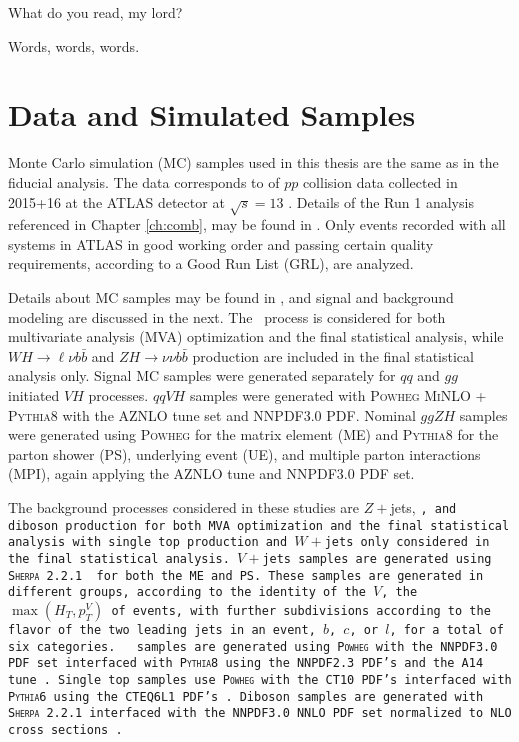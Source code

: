 \begin{savequote}[75mm]
What do you read, my lord?

Words, words, words.
\end{savequote}

\chapter{Data and Simulated Samples}
\label{ch:samples}
 Monte Carlo simulation (MC) samples used in this thesis are the same as in the fiducial analysis.  The data corresponds to \LUMI of $pp$ collision data collected in 2015+16 at the ATLAS detector at $\sqrt{s}=13$ \TeV.  Details of the Run 1 analysis referenced in Chapter \ref{ch:comb}, may be found in \cite{run1note}.  Only events recorded with all systems in ATLAS in good working order and passing certain quality requirements, according to a Good Run List (GRL), are analyzed.  

Details about MC samples may be found in \cite{modelingnote}, and signal and background modeling are discussed in the next.  The \ZH\, process is considered for both multivariate analysis (MVA) optimization and the final statistical analysis, while $WH\to\ell\nu b\bar{b}$ and $ZH\to\nu\nu b\bar{b}$ production are included in the final statistical analysis only.  Signal MC samples were generated separately for $qq$ and $gg$ initiated $VH$ processes.  $qqVH$ samples were generated with \textsc{Powheg MiNLO + Pythia8} with the AZNLO tune set and NNPDF3.0 PDF.  %
  Nominal $ggZH$ samples were generated using \textsc{Powheg} for the matrix element (ME) and \textsc{Pythia8} for the parton shower (PS), underlying event (UE), and multiple parton interactions (MPI), again applying the AZNLO tune and NNPDF3.0 PDF set. \cite{support17}

The background processes considered in these studies are $Z+$jets, \tt, and diboson production for both MVA optimization and the final statistical analysis with single top production and $W+$jets only considered in the final statistical analysis.  $V+$jets samples are generated using \textsc{Sherpa 2.2.1} \cite{support18} for both the ME and PS.  These samples are generated in different groups, according to the identity of the $V$, the $\max\left(H_T,p_T^V\right)$ of events, with further subdivisions according to the flavor of the two leading jets in an event, $b$, $c$, or $l$, for a total of six categories.  \tt\, samples are generated using \textsc{Powheg} with the NNPDF3.0 PDF set interfaced with \textsc{Pythia8} using the NNPDF2.3 PDF's and the A14 tune \cite{support19}.  Single top samples use \textsc{Powheg} with the CT10 PDF's interfaced with \textsc{Pythia6} using the CTEQ6L1 PDF's \cite{support20,support21}.  Diboson samples are generated with \textsc{Sherpa 2.2.1} interfaced with the NNPDF3.0 NNLO PDF set normalized to NLO cross sections \cite{support22}.

